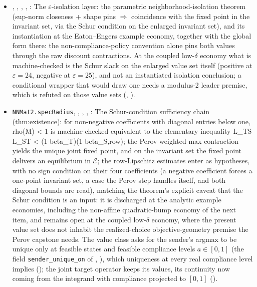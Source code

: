\begin{itemize}[leftmargin=1.4em,itemsep=1pt]
\item {}, , , , : The $\varepsilon$-isolation layer: the parametric neighborhood-isolation theorem (sup-norm closeness + shape pins $\Rightarrow$ coincidence with the fixed point in the invariant set, via the Schur condition on the enlarged invariant set), and its instantiation at the Eaton--Engers example economy, together with the global form there: the non-compliance-policy convention alone pins both values through the raw discount contractions. At the coupled low-\(\delta\) economy what is machine-checked is the Schur slack on the enlarged value set itself (positive at \(\varepsilon=24\), negative at \(\varepsilon=25\)), and not an instantiated isolation conclusion; a conditional wrapper that would draw one needs a modulus-2 leader premise, which is refuted on those value sets (, ).
\item \texttt{NNMat2.specRadius}, , , , : The Schur-condition sufficiency chain (thm:existence): for non-negative coefficients with diagonal entries below one, rho(M) \textless{} 1 is machine-checked equivalent to the elementary inequality L\_TS L\_ST \textless{} (1-beta\_T)(1-beta\_S,row); the Perov weighted-max contraction yields the unique joint fixed point, and on the invariant set the fixed point delivers an equilibrium in $\mathcal E$; the row-Lipschitz estimates enter as hypotheses, with no sign condition on their four coefficients (a negative coefficient forces a one-point invariant set, a case the Perov step handles itself, and both diagonal bounds are read), matching the theorem's explicit caveat that the Schur condition is an input: it is discharged at the analytic example economies, including the non-affine quadratic-bump economy of the next item, and remains open at the coupled low-$\delta$ economy, where the present value set does not inhabit the realized-choice objective-geometry premise the Perov capstone needs. The value class asks for the sender's argmax to be unique only at feasible states and feasible compliance levels $a\in[0,1]$ (the field \texttt{sender\_unique\_on} of , ), which uniqueness at every real compliance level implies (); the joint target operator keeps its values, its continuity now coming from the integrand with compliance projected to $[0,1]$ ().

\end{itemize}
